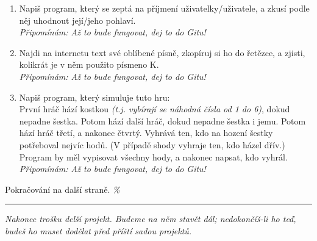 \documentclass[a4paper,10pt]{article}
\newcommand\startsection[1]{
     \vspace{0.2ex}
    \hrule
    {\fontspec{Oxygen} \tiny
     \vspace{-1ex}
     \emph{#1}
     \vspace{-1.5em}
    }
}
\begin{document}
\begin{enumerate}[resume]

\item Napiš program, který se zeptá na příjmení uživatelky/uživatele,
    a zkusí podle něj uhodnout její/jeho pohlaví.
    \\\emph{\small Připomínám: Až to bude fungovat, dej to do Gitu!}

\item Najdi na internetu text své oblíbené písně, zkopíruj si ho do řetězce,
    a zjisti, kolikrát je v něm použito písmeno K.
    \\\emph{\small Připomínám: Až to bude fungovat, dej to do Gitu!}

\item Napiš program, který simuluje tuto hru:
    \\První hráč hází kostkou
    \emph{(t.j. vybírají se náhodná čísla od 1 do 6)},
    dokud nepadne šestka.
    Potom hází další hráč, dokud nepadne šestka i jemu.
    Potom hází hráč třetí, a nakonec čtvrtý.
    Vyhrává ten, kdo na hození šestky potřeboval nejvíc hodů.
    (V případě shody vyhraje ten, kdo házel dřív.)
    \\Program by měl vypisovat všechny hody, a nakonec napsat, kdo vyhrál.
    \\\emph{\small Připomínám: Až to bude fungovat, dej to do Gitu!}

\end{enumerate}

\vfill

Pokračování na další straně. \hfill \emph{\%}

\newpage

\startsection{Nakonec trošku delší projekt. Budeme na něm stavět dál; nedokončíš-li ho teď, budeš ho muset dodělat před příští sadou projektů.}

\begin{center}
\end{center}
\end{document}
